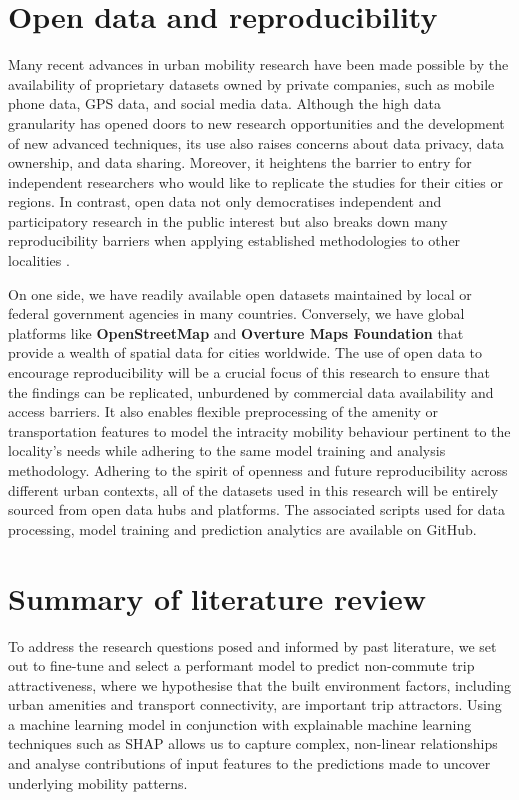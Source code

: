 \section{Open data and reproducibility}

Many recent advances in urban mobility research have been made possible by the availability of proprietary datasets owned by private companies, such as mobile phone data, GPS data, and social media data. Although the high data granularity has opened doors to new research opportunities and the development of new advanced techniques, its use also raises concerns about data privacy, data ownership, and data sharing. Moreover, it heightens the barrier to entry for independent researchers who would like to replicate the studies for their cities or regions. In contrast, open data not only democratises independent and participatory research in the public interest but also breaks down many reproducibility barriers when applying established methodologies to other localities \citep{yadavRoleOpenData2017}.

On one side, we have readily available open datasets maintained by local or federal government agencies in many countries. Conversely, we have global platforms like \textbf{OpenStreetMap} and \textbf{Overture Maps Foundation} that provide a wealth of spatial data for cities worldwide. The use of open data to encourage reproducibility will be a crucial focus of this research to ensure that the findings can be replicated, unburdened by commercial data availability and access barriers. It also enables flexible preprocessing of the amenity or transportation features to model the intracity mobility behaviour pertinent to the locality's needs while adhering to the same model training and analysis methodology. Adhering to the spirit of openness and future reproducibility across different urban contexts, all of the datasets used in this research will be entirely sourced from open data hubs and platforms. The associated scripts used for data processing, model training and prediction analytics are available on GitHub.

\section{Summary of literature review}

To address the research questions posed and informed by past literature, we set out to fine-tune and select a performant model to predict non-commute trip attractiveness, where we hypothesise that the built environment factors, including urban amenities and transport connectivity, are important trip attractors. Using a machine learning model in conjunction with explainable machine learning techniques such as SHAP allows us to capture complex, non-linear relationships and analyse contributions of input features to the predictions made to uncover underlying mobility patterns.